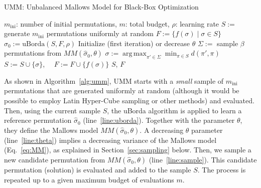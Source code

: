 \documentclass[runningheads]{llncs}
\newcommand{\assign}{\ensuremath{:=}}
\DeclareMathOperator*{\argmax}{arg\,max}
\newcommand{\minit}{\ensuremath{m_\text{ini}}\xspace}
\newcommand{\FEmax}{\ensuremath{m}}
\begin{document}
\begin{algorithm}[t]
 \caption{UMM: Unbalanced Mallows Model for Black-Box Optimization}
 \label{alg:umm}
  \begin{algorithmic}[1]
    \Require $\minit$: number of initial permutations, $\FEmax$: total budget, $\rho$: learning rate
    \State $S \assign $ generate $\minit$ permutations uniformly at random
    \State $F \assign \{ f(\sigma) \mid \sigma \in S\}$ 
    \For{$i \assign \minit$ \textbf{to} $\FEmax$ \text{evaluations}}
    \State $\hat\sigma_0 \assign \text{uBorda}(S, F,\rho)$\label{line:uborda}
    \State Initialize (first iteration) or decrease  $\theta$\label{line:theta}
    \State $\Sigma \assign$ sample $\beta$ permutations from  $MM(\hat\sigma_0, \theta)$\label{line:sample}
    \State $\sigma\assign  \argmax_{\pi'\in \Sigma}\min_{ \pi \in S} d(\pi', \pi)   $ \label{line:distance}
    \State $S \assign S \cup \{\sigma\}$, $\quad F \assign F \cup \{f(\sigma)\}$
    \EndFor 
    \State \Return $S$, $F$
 \end{algorithmic}
\end{algorithm}


As shown in Algorithm~\ref{alg:umm}, UMM  starts with a \emph{small} sample of $\minit$ permutations that are generated uniformly at random  (although it would be possible to employ Latin Hyper-Cube sampling or other methods) and evaluated. Then, using the current sample $S$, the uBorda algorithm is applied to learn a reference permutation $\hat{\sigma}_0$ (line~\ref{line:uborda}). 
Together with the parameter $\theta$, they define the Mallows model $MM(\hat\sigma_0, \theta)$. 
A decreasing $\theta$ parameter (line~\ref{line:theta}) implies a decreasing variance of the Mallows model (Eq.~\ref{eq:MM}), as explained in  Section~\ref{sec:sampling} below. 
Then, we sample a new candidate permutation from  $MM(\hat\sigma_0, \theta)$ (line~\ref{line:sample}). This candidate permutation (solution) is evaluated and added to the sample $S$. The process is repeated up to a given maximum budget of evaluations $\FEmax$.
\end{document}
